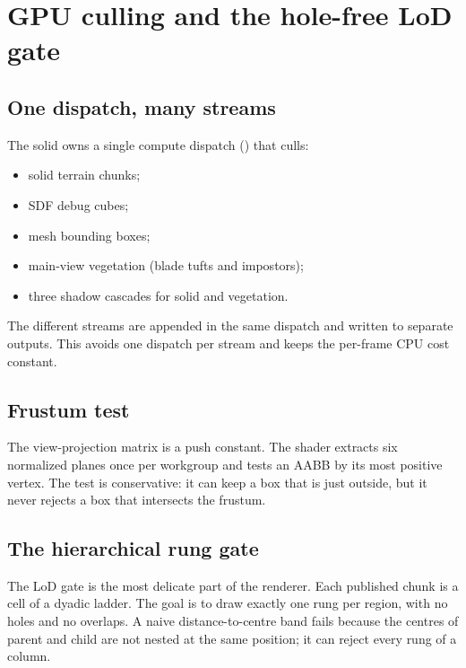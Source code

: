 \section{GPU culling and the hole-free LoD gate}
\label{sec:cull}

\subsection{One dispatch, many streams}

The solid  owns a single compute dispatch
() that culls:
\begin{itemize}
\item solid terrain chunks;
\item SDF debug cubes;
\item mesh bounding boxes;
\item main-view vegetation (blade tufts and impostors);
\item three shadow cascades for solid and vegetation.
\end{itemize}
The different streams are appended in the same dispatch and written to
separate outputs.  This avoids one dispatch per stream and keeps the
per-frame CPU cost constant.

\subsection{Frustum test}

The view-projection matrix is a push constant.  The shader extracts six
normalized planes once per workgroup and tests an AABB by its most positive
vertex.  The test is conservative: it can keep a box that is just outside,
but it never rejects a box that intersects the frustum.

\subsection{The hierarchical rung gate}

The LoD gate is the most delicate part of the renderer.  Each published
chunk is a cell of a dyadic ladder.  The goal is to draw exactly one rung
per region, with no holes and no overlaps.  A naive distance-to-centre band
fails because the centres of parent and child are not nested at the same
position; it can reject every rung of a column.


